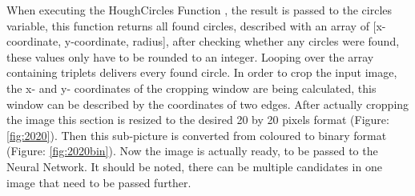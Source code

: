 When executing the HoughCircles Function \cite{houghcircles}, the result is passed to the circles variable, this function returns all found circles, described with an array of [x-coordinate, y-coordinate, radius],  after checking whether any circles were found, these values only have to be rounded to an integer. Looping over the array containing triplets delivers every found circle. \newline
In order to crop the input image, the x- and y- coordinates of the cropping window are being calculated, this window can be described by the coordinates of two edges. After actually cropping the image this section is resized to the desired 20 by 20 pixels format (Figure: \ref{fig:2020}). Then this sub-picture is converted from coloured to binary format (Figure: \ref{fig:2020bin}). Now the image is actually ready, to be passed to the Neural Network. It should be noted, there can be multiple candidates in one image that need to be passed further.   

